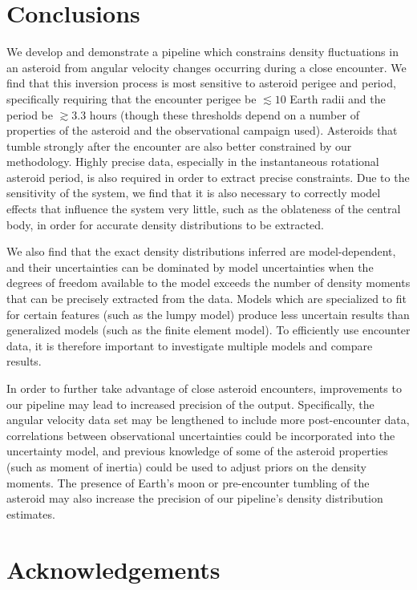 \documentclass[fleqn,usenatbib]{mnras}
\begin{document}
\section{Conclusions}

We develop and demonstrate a pipeline which constrains density fluctuations in an asteroid from angular velocity changes occurring during a close encounter. We find that this inversion process is most sensitive to asteroid perigee and period, specifically requiring that the encounter perigee be $\lesssim 10$ Earth radii and the period be $\gtrsim 3.3$ hours (though these thresholds depend on a number of properties of the asteroid and the observational campaign used). Asteroids that tumble strongly after the encounter are also better constrained by our methodology. Highly precise data, especially in the instantaneous rotational asteroid period, is also required in order to extract precise constraints. Due to the sensitivity of the system, we find that it is also necessary to correctly model effects that influence the system very little, such as the oblateness of the central body, in order for accurate density distributions to be extracted.

We also find that the exact density distributions inferred are model-dependent, and their uncertainties can be dominated by model uncertainties when the degrees of freedom available to the model exceeds the number of density moments that can be precisely extracted from the data. Models which are specialized to fit for certain features (such as the lumpy model) produce less uncertain results than generalized models (such as the finite element model). To efficiently use encounter data, it is therefore important to investigate multiple models and compare results.

In order to further take advantage of close asteroid encounters, improvements to our pipeline may lead to increased precision of the output. Specifically, the angular velocity data set may be lengthened to include more post-encounter data, correlations between observational uncertainties could be incorporated into the uncertainty model, and previous knowledge of some of the asteroid properties (such as moment of inertia) could be used to adjust priors on the density moments. The presence of Earth's moon or pre-encounter tumbling of the asteroid may also increase the precision of our pipeline's density distribution estimates.


\section*{Acknowledgements}
\end{document}
